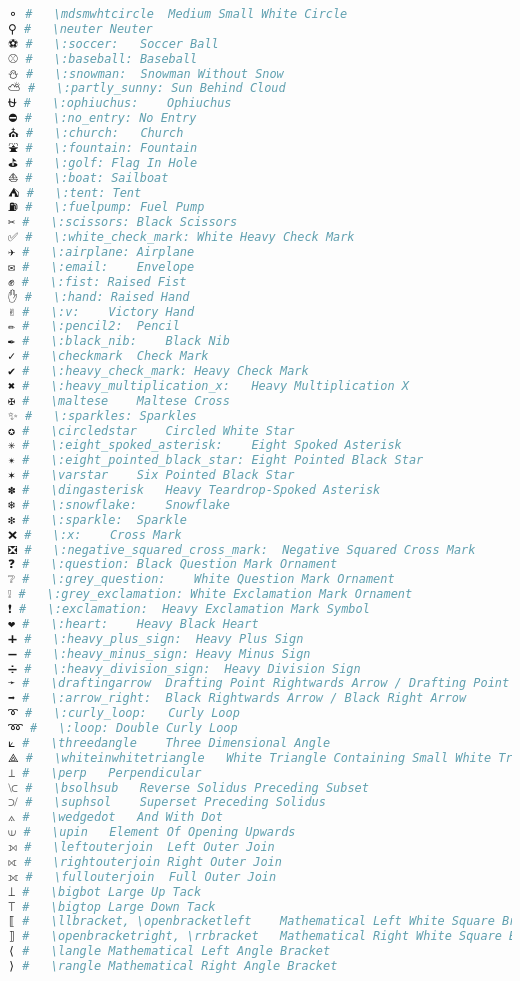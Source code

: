 \begin{lstlisting}[language=Julia, linewidth=\textwidth]
⚬ #   \mdsmwhtcircle  Medium Small White Circle
⚲ #   \neuter Neuter
⚽ #   \:soccer:   Soccer Ball
⚾ #   \:baseball: Baseball
⛄ #   \:snowman:  Snowman Without Snow
⛅ #   \:partly_sunny: Sun Behind Cloud
⛎ #   \:ophiuchus:    Ophiuchus
⛔ #   \:no_entry: No Entry
⛪ #   \:church:   Church
⛲ #   \:fountain: Fountain
⛳ #   \:golf: Flag In Hole
⛵ #   \:boat: Sailboat
⛺ #   \:tent: Tent
⛽ #   \:fuelpump: Fuel Pump
✂ #   \:scissors: Black Scissors
✅ #   \:white_check_mark: White Heavy Check Mark
✈ #   \:airplane: Airplane
✉ #   \:email:    Envelope
✊ #   \:fist: Raised Fist
✋ #   \:hand: Raised Hand
✌ #   \:v:    Victory Hand
✏ #   \:pencil2:  Pencil
✒ #   \:black_nib:    Black Nib
✓ #   \checkmark  Check Mark
✔ #   \:heavy_check_mark: Heavy Check Mark
✖ #   \:heavy_multiplication_x:   Heavy Multiplication X
✠ #   \maltese    Maltese Cross
✨ #   \:sparkles: Sparkles
✪ #   \circledstar    Circled White Star
✳ #   \:eight_spoked_asterisk:    Eight Spoked Asterisk
✴ #   \:eight_pointed_black_star: Eight Pointed Black Star
✶ #   \varstar    Six Pointed Black Star
✽ #   \dingasterisk   Heavy Teardrop-Spoked Asterisk
❄ #   \:snowflake:    Snowflake
❇ #   \:sparkle:  Sparkle
❌ #   \:x:    Cross Mark
❎ #   \:negative_squared_cross_mark:  Negative Squared Cross Mark
❓ #   \:question: Black Question Mark Ornament
❔ #   \:grey_question:    White Question Mark Ornament
❕ #   \:grey_exclamation: White Exclamation Mark Ornament
❗ #   \:exclamation:  Heavy Exclamation Mark Symbol
❤ #   \:heart:    Heavy Black Heart
➕ #   \:heavy_plus_sign:  Heavy Plus Sign
➖ #   \:heavy_minus_sign: Heavy Minus Sign
➗ #   \:heavy_division_sign:  Heavy Division Sign
➛ #   \draftingarrow  Drafting Point Rightwards Arrow / Drafting Point Right Arrow
➡ #   \:arrow_right:  Black Rightwards Arrow / Black Right Arrow
➰ #   \:curly_loop:   Curly Loop
➿ #   \:loop: Double Curly Loop
⟀ #   \threedangle    Three Dimensional Angle
⟁ #   \whiteinwhitetriangle   White Triangle Containing Small White Triangle
⟂ #   \perp   Perpendicular
⟈ #   \bsolhsub   Reverse Solidus Preceding Subset
⟉ #   \suphsol    Superset Preceding Solidus
⟑ #   \wedgedot   And With Dot
⟒ #   \upin   Element Of Opening Upwards
⟕ #   \leftouterjoin  Left Outer Join
⟖ #   \rightouterjoin Right Outer Join
⟗ #   \fullouterjoin  Full Outer Join
⟘ #   \bigbot Large Up Tack
⟙ #   \bigtop Large Down Tack
⟦ #   \llbracket, \openbracketleft    Mathematical Left White Square Bracket
⟧ #   \openbracketright, \rrbracket   Mathematical Right White Square Bracket
⟨ #   \langle Mathematical Left Angle Bracket
⟩ #   \rangle Mathematical Right Angle Bracket

\end{lstlisting}
